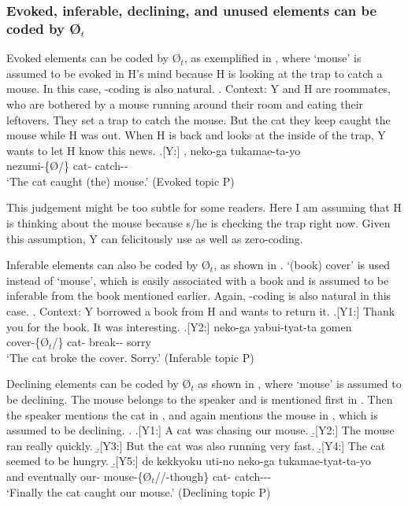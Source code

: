 \subsubsection{Evoked, inferable, declining, and unused elements can be coded by {\O$_{t}$}}

Evoked elements can be coded by {\O$_{t}$},
as exemplified in \Next,
where `mouse' is assumed to be evoked in H's mind
because H is looking at the trap to catch a mouse.
In this case, -coding is also natural.
%
\ex. Context: Y and H are roommates,
	who are bothered by a mouse running around their room
	and eating their leftovers.
	They set a trap to catch the mouse.
	But the cat they keep caught the mouse while H was out.
	When H is back and looks at the inside of the trap,
	Y wants to let H know this news.
	\ag.[Y:] , neko-ga tukamae-ta-yo \\
		nezumi-\{{\O}/\} cat- catch-- \\
		`The cat caught (the) mouse.' \hfill{(Evoked topic P)}

This judgement might be too subtle for some readers.
Here I am assuming that H is thinking about the mouse because s/he is checking the trap right now.
Given this assumption, Y can felicitously use  as well as zero-coding.

Inferable elements can also be coded by {\O$_{t}$},
as shown in \Next.
 `(book) cover' is used instead of  `mouse',
which is easily associated with a book and is assumed to be inferable from the book mentioned earlier.
Again, -coding is also natural in this case.
%
\ex. Context: Y borrowed a book from H and wants to return it.
 \a.[Y1:] Thank you for the book. It was interesting.
 \bg.[Y2:]  neko-ga yabui-tyat-ta gomen \\
   cover-\{{\O$_{t}$}/\} cat- break-- sorry \\
   `The cat broke the cover. Sorry.' \hfill{(Inferable topic P)}


Declining elements can be coded by {\O$_{t}$}
as shown in \Next,
where `mouse' is assumed to be declining.
The mouse belongs to the speaker and is mentioned first in \Next[-Y2].
Then the speaker mentions the cat in \Next[-Y3-4],
and again mentions the mouse in \Next[-Y5], which is assumed to be declining.
%
\ex.
 \a.[Y1:] A cat was chasing our mouse.
 \b.[Y2:] The mouse ran really quickly.
 \b.[Y3:] But the cat was also running very fast.
 \b.[Y4:] The cat seemed to be hungry.
 \b.[Y5:] de kekkyoku uti-no  neko-ga tukamae-tyat-ta-yo \\
   and eventually our- {mouse-\{{\O$_{t}$}//-though\}} cat- catch--- \\
   `Finally the cat caught our mouse.' \hfill{(Declining topic P)}

